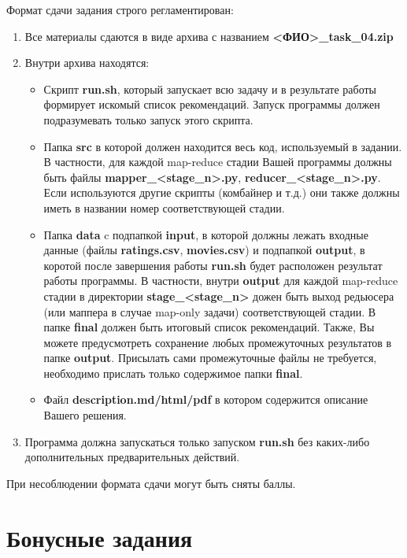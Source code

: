 \documentclass[11pt, fleqn]{article}
\begin{document}
Формат сдачи задания строго регламентирован:
\begin{enumerate}
	\item Все материалы сдаются в виде архива с названием \textbf{<ФИО>\_task\_04.zip}
	\item Внутри архива находятся:
	\begin{itemize}
		\item Скрипт \textbf{run.sh}, который запускает всю задачу и в результате работы формирует искомый список рекомендаций. Запуск программы должен подразумевать только запуск этого скрипта.
		\item Папка \textbf{src} в которой должен находится весь код, используемый в задании. В частности, для каждой map-reduce стадии Вашей программы должны быть файлы \textbf{mapper\_<stage\_n>.py}, \textbf{reducer\_<stage\_n>.py}. Если используются другие скрипты (комбайнер и т.д.) они также должны иметь в названии номер соответствующей стадии.
		\item Папка \textbf{data} c подпапкой \textbf{input}, в которой должны лежать входные данные (файлы \textbf{ratings.csv}, \textbf{movies.csv}) и подпапкой \textbf{output}, в коротой после завершения работы \textbf{run.sh} будет расположен результат работы программы. В частности, внутри \textbf{output} для каждой map-reduce стадии в директории \textbf{stage\_<stage\_n>} дожен быть выход редьюсера (или маппера в случае map-only задачи) соответствующей стадии. В папке \textbf{final} должен быть итоговый список рекомендаций. Также, Вы можете предусмотреть сохранение любых промежуточных результатов в папке \textbf{output}. Присылать сами промежуточные файлы не требуется, необходимо прислать только содержимое папки \textbf{final}.
		\item Файл \textbf{description.md/html/pdf} в котором содержится описание Вашего решения.
	\end{itemize}
	\item Программа должна запускаться только запуском \textbf{run.sh} без каких-либо дополнительных предварительных действий. 
\end{enumerate}
При несоблюдении формата сдачи могут быть сняты баллы.
 
\section{Бонусные задания}
\end{document}
